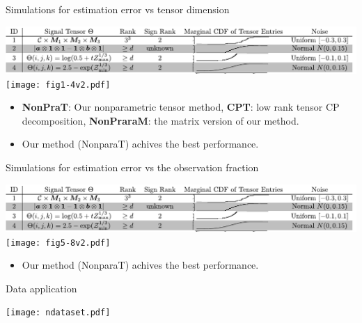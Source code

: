 \documentclass[10pt, mathserif]{beamer} %
\theoremstyle{definition}
\theoremstyle{plain}
\begin{document}
\begin{frame}{Simulations for estimation error vs tensor dimension}
    \begin{center}
    \includegraphics[width = \textwidth]{simulation.pdf}
    \texttt{[image: fig1-4v2.pdf]}
    \end{center}
    \begin{itemize}
    \item {\color{blue}\bf NonPraT}: Our nonparametric tensor method, {\color{red}\bf CPT}: low rank tensor CP decomposition, {\color{green}\bf NonPraraM}: the matrix version of our method.
    \item Our method (NonparaT) achives the best performance.
    \end{itemize}
\end{frame}

\begin{frame}{Simulations for estimation error vs the observation fraction}
    \begin{center}
    \includegraphics[width = \textwidth]{simulation.pdf}
    \texttt{[image: fig5-8v2.pdf]}
    \end{center}
    \begin{itemize}
        \item Our method (NonparaT) achives the best performance.
    \end{itemize}
\end{frame}

\begin{frame}{Data application}
    \begin{center}
    \texttt{[image: ndataset.pdf]}
    \end{center}
\end{frame}
\end{document}
